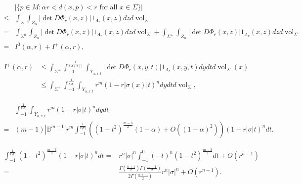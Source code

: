 \documentclass[10pt,a4paper]{amsart}
\begin{document}
\begin{equation}\label{ineq est I0 I+}
\begin{aligned}
& |\{p \in M: \alpha r<d(x, p)<r \text { for all } x \in \Sigma\} | \\
\le & \int_{\Sigma} \int_{Z_\alpha}\left|\det D\Phi_r(x, z)\right| 1_{A_r}(x, z) dz d \operatorname{vol}_{\Sigma} \\
=& \int_{\Sigma^0} \int_{Z_\alpha}\left|\det D\Phi_r(x, z)\right| 1_{A_r}(x, z) dz d \operatorname{vol}_{\Sigma}
+ \int_{\Sigma^+} \int_{Z_\alpha}\left|\det D\Phi_r(x, z)\right| 1_{A_r}(x, z) dz d \operatorname{vol}_{\Sigma}\\
=& I^0(\alpha, r)+I^+(\alpha, r),
\end{aligned}
\end{equation}

\begin{equation}\label{ineq I+}
\begin{aligned}
I^+(\alpha, r) & \le \int_{\Sigma^+} \int_{-1}^{\frac{1}{r|\sigma(x)|}} \int_{Y_{\alpha, x, t}}\left|\det D \Phi_r(x, y, t)\right| 1_{A_r}(x, y, t) d y d t d \operatorname{vol}_{\Sigma} (x)\\
& \le \int_{\Sigma^+} \int_{-1}^{\frac{1}{r|\sigma|}} \int_{Y_{\alpha, x, t}} r^m(1-r|\sigma(x)| t)^n d y d t d \operatorname{vol}_{\Sigma},
\end{aligned}
\end{equation}

\begin{equation}\label{ineq I+2}
\begin{aligned}
& \int_{-1}^{\frac{1}{r|\sigma|}} \int_{Y_{\alpha, x, t}} r^m(1-r|\sigma| t)^n d y d t\\
=& (m-1)\left|\mathbb{B}^{m-1}\right|r^m
\int_{-1}^{\frac{1}{r|\sigma|}} \left(\left(1-t^2\right)^{\frac{m-3}{2}}(1-\alpha)+O\left((1-\alpha)^2\right)\right)(1-r|\sigma| t)^n d t.
\end{aligned}
\end{equation}

\begin{equation}\label{ineq I+3}
\begin{aligned}
\int_{-1}^{\frac{1}{r|\sigma|}} \left(1-t^2\right)^{\frac{m-3}{2}} (1-r|\sigma| t)^n d t
=& r^n|\sigma|^n \int_{-1}^0(-t)^n\left(1-t^2\right)^{\frac{m-3}{2}} d t+O\left(r^{n-1}\right)\\
=& \frac{\Gamma\left(\frac{n+1}{2}\right) \Gamma\left(\frac{m-1}{2}\right)}{2\Gamma\left(\frac{n+m}{2}\right)} r^n|\sigma|^n+O\left(r^{n-1}\right).
\end{aligned}
\end{equation}
\end{document}
